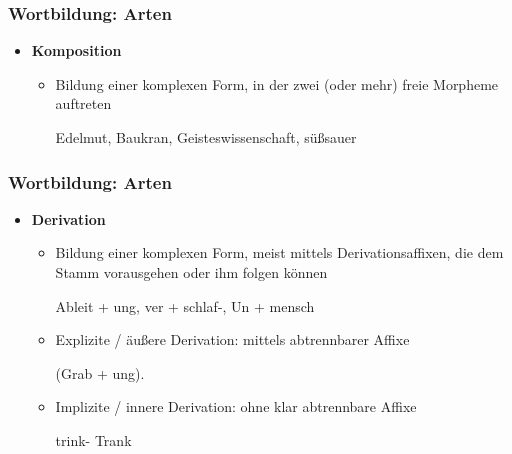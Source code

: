 \begin{frame}
\frametitle{Wortbildung: Arten}

\begin{itemize}
\item \textbf{Komposition}

\begin{itemize}
\item Bildung einer komplexen Form, in der zwei (oder mehr) freie Morpheme auftreten

\ea Edelmut, Baukran, Geisteswissenschaft, süßsauer
\z

\end{itemize}

\end{itemize}

\end{frame}

\begin{frame}
\frametitle{Wortbildung: Arten}

\begin{itemize}
\item \textbf{Derivation}

\begin{itemize}
\item Bildung einer komplexen Form, meist mittels Derivationsaffixen, die dem Stamm vorausgehen oder ihm folgen können

\ea Ableit + ung, ver + schlaf-, Un + mensch
\z

\item Explizite / äußere Derivation: mittels abtrennbarer Affixe

\ea (Grab + ung).
\z

\item Implizite / innere Derivation: ohne klar abtrennbare Affixe

\ea trink- \vs Trank
\z

\end{itemize}
\end{itemize}

\end{frame}

